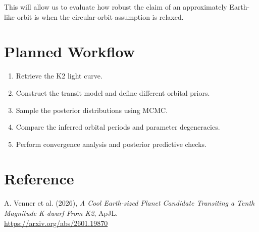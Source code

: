 \documentclass[11pt]{article}
\begin{document}
This will allow us to evaluate how robust the claim of an approximately Earth-like orbit is when the circular-orbit assumption is relaxed.

\section*{Planned Workflow}

\begin{enumerate}
    \item Retrieve the K2 light curve.
    \item Construct the transit model and define different orbital priors.
    \item Sample the posterior distributions using MCMC.
    \item Compare the inferred orbital periods and parameter degeneracies.
    \item Perform convergence analysis and posterior predictive checks.
\end{enumerate}

\section*{Reference}

A. Venner et al. (2026), \textit{A Cool Earth-sized Planet Candidate Transiting a Tenth Magnitude K-dwarf From K2}, ApJL.\\
\url{https://arxiv.org/abs/2601.19870}
\end{document}
